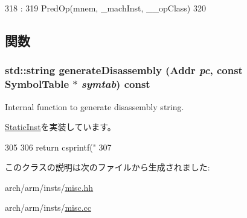 \begin{DoxyCode}
318                                                                           :
319         PredOp(mnem, _machInst, __opClass)
320     {}

\end{DoxyCode}


\subsection{関数}
\hypertarget{classUnknownOp_a95d323a22a5f07e14d6b4c9385a91896}{
\subsubsection[{generateDisassembly}]{\setlength{\rightskip}{0pt plus 5cm}std::string generateDisassembly ({\bf Addr} {\em pc}, \/  const SymbolTable $\ast$ {\em symtab}) const}}
\label{classUnknownOp_a95d323a22a5f07e14d6b4c9385a91896}
Internal function to generate disassembly string. 

\hyperlink{classStaticInst_ab4a569d2623620c04f8a52bbd91d63b9}{StaticInst}を実装しています。


\begin{DoxyCode}
305 {
306     return csprintf("%
307 }
\end{DoxyCode}


このクラスの説明は次のファイルから生成されました:\begin{DoxyCompactItemize}
\item 
arch/arm/insts/\hyperlink{arch_2arm_2insts_2misc_8hh}{misc.hh}\item 
arch/arm/insts/\hyperlink{arch_2arm_2insts_2misc_8cc}{misc.cc}\end{DoxyCompactItemize}
